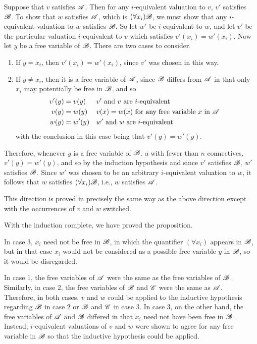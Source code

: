 \begin{proposition}
\begin{enumerate}
      \Ra{} Suppose that \(v\) satisfies \(\mathscr{A}\). Then for any \(i\)-equivalent valuation to \(v\), \(v'\) satisfies \(\mathscr{B}\). To show that \(w\) satisfies \(\mathscr{A}\), which is \((\forall x_i) \mathscr{B}\), we must show that any \(i\)-equivalent valuation to \(w\) satisfies \(\mathscr{B}\). So let \(w'\) be \(i\)-equivalent to \(w\), and let \(v'\) be the particular valuation \(i\)-equivalent to \(v\) which satisfies \(v'(x_i) = w'(x_i)\). Now let \(y\) be a free variable of \(\mathscr{B}\). There are two cases to consider.
      \begin{enumerate}
        \item If \(y = x_i\), then \(v'(x_i) = w'(x_i)\), since \(v'\) was chosen in this way. 
        \item If \(y \neq x_i\), then it is a free variable of \(\mathscr{A}\), since \(\mathscr{B}\) differs from \(\mathscr{A}\) in that only \(x_i\) may potentially be free in \(\mathscr{B}\), and so
          \begin{align*}
            v'(y) &= v(y)       &&\text{\(v'\) and \(v\) are \(i\)-equivalent}\\
            v(y)  &= w(y)       &&\text{\(v(x) = w(x)\) for any free variable \(x\) in \(\ensuremath\mathscr{A}\)}\\
            w(y)  &= w'(y)      &&\text{\(w'\) and \(w\) are \(i\)-equivalent}
          \end{align*}
        with the conclusion in this case being that \(v'(y) = w'(y)\).
      \end{enumerate}
      Therefore, whenever \(y\) is a free variable of \(\mathscr{B}\), a \wf{} with fewer than \(n\) connectives, \(v'(y) = w'(y)\), and so by the induction hypothesis and since \(v'\) satisfies \(\mathscr{B}\), \(w'\) satisfies \(\mathscr{B}\). Since \(w'\) was chosen to be an arbitrary \(i\)-equivalent valuation to \(w\), it follows that \(w\) satisfies \((\forall x_i) \mathscr{B}\), i.e., \(w\) satisfies \(\mathscr{A}\).

      \La{} This direction is proved in precisely the same way as the above direction except with the occurrences of \(v\) and \(w\) switched.
  \end{enumerate}

  With the induction complete, we have proved the proposition.

  \note{} In case 3, \(x_i\) need not be free in \(\mathscr{B}\), in which the quantifier \((\forall x_i)\) appears in \(\mathscr{B}\), but in that case \(x_i\) would not be considered as a possible free variable \(y\) in \(\mathscr{B}\), so it would be disregarded.

  \note{} In case 1, the free variables of \(\mathscr{A}\) were the same as the free variables of \(\mathscr{B}\). Similarly, in case 2, the free variables of \(\mathscr{B}\) and \(\mathscr{C}\) were the same as \(\mathscr{A}\). Therefore, in both cases, \(v\) and \(w\) could be applied to the inductive hypothesis regarding \(\mathscr{B}\) in case 2 or \(\mathscr{B}\) and \(\mathscr{C}\) in case 3. In case 3, on the other hand, the free variables of \(\mathscr{A}\) and \(\mathscr{B}\) differed in that \(x_i\) need not have been free in \(\mathscr{B}\). Instead, \(i\)-equivalent valuations of \(v\) and \(w\) were shown to agree for any free variable in \(\mathscr{B}\) so that the inductive hypothesis could be applied.
\end{proposition}

